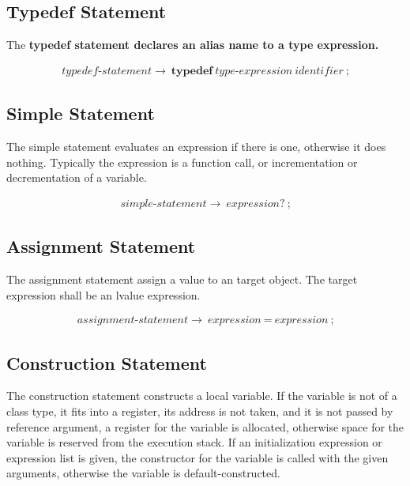 \documentclass[a4paper,oneside,11pt]{article}
\begin{document}
\subsection{Typedef Statement}\label{typedefstatement}

The \bf{typedef} statement declares an alias name to a type expression.

\begin{align*}
typedef\textrm{-}statement \rightarrow \> \textbf{typedef} \> \hyperref[typeexpr]{type\textrm{-}expression} \> \hyperref[identifier]{identifier} \> \texttt{;}
\end{align*}

\subsection{Simple Statement}\label{simplestatement}

The simple statement evaluates an expression if there is one, otherwise it does nothing.
Typically the expression is a function call, or incrementation or decrementation of a variable.

\begin{align*}
simple\textrm{-}statement \rightarrow \> \hyperref[expression]{expression}? \> \texttt{;}
\end{align*}

\subsection{Assignment Statement}\label{assignmentstatement}

The assignment statement assign a value to an target object. The target expression shall be an lvalue expression.

\begin{align*}
assignment\textrm{-}statement \rightarrow \> \hyperref[expression]{expression} \> \texttt{=} \> \hyperref[expression]{expression} \> \texttt{;}
\end{align*}

\subsection{Construction Statement}\label{constructionstatement}

The construction statement constructs a local variable.
If the variable is not of a class type, it fits into a register, its address is not taken,
and it is not passed by reference argument, a register for the variable is allocated,
otherwise space for the variable is reserved from the execution stack.
If an initialization expression or expression list is given, the constructor for the variable is called with the given arguments,
otherwise the variable is default-constructed.
\end{document}
